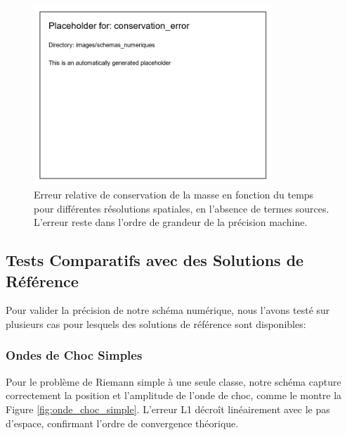 \begin{figure}[htbp]
\centering
\includegraphics[width=0.8\textwidth]{images/schemas_numeriques/conservation_error}
\caption{Erreur relative de conservation de la masse en fonction du temps pour différentes résolutions spatiales, en l'absence de termes sources. L'erreur reste dans l'ordre de grandeur de la précision machine.}
\label{fig:conservation}
\end{figure}

\subsection{Tests Comparatifs avec des Solutions de Référence}
\label{subsec:tests_comparatifs}

Pour valider la précision de notre schéma numérique, nous l'avons testé sur plusieurs cas pour lesquels des solutions de référence sont disponibles:

\subsubsection{Ondes de Choc Simples}
\label{subsubsec:ondes_choc_simples}

Pour le problème de Riemann simple à une seule classe, notre schéma capture correctement la position et l'amplitude de l'onde de choc, comme le montre la Figure \ref{fig:onde_choc_simple}. L'erreur L1 décroît linéairement avec le pas d'espace, confirmant l'ordre de convergence théorique.

